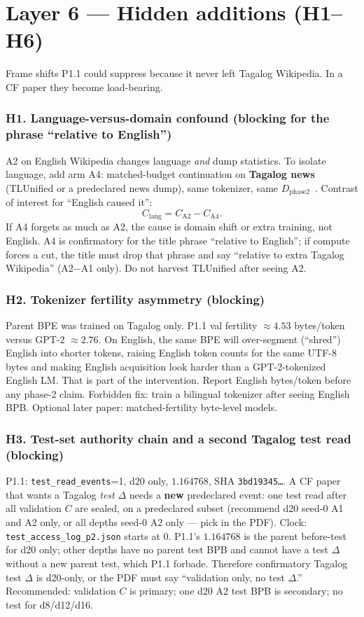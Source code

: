 \documentclass[11pt,a4paper]{article}
\begin{document}
\section{Layer 6 --- Hidden additions (H1--H6)}
\label{sec:L6}

Frame shifts P1.1 could suppress because it never left Tagalog Wikipedia. In a CF paper they become load-bearing.

\subsubsection*{H1. Language-versus-domain confound (blocking for the phrase ``relative to English'')}
A2 on English Wikipedia changes language \emph{and} dump statistics. To isolate language, add arm A4: matched-budget continuation on \textbf{Tagalog news} (TLUnified or a predeclared news dump), same tokenizer, same $D_{\mathrm{phase2}}$~\cite{cruz2022tlunified}. Contrast of interest for ``English caused it'':
\[
C_{\mathrm{lang}}=C_{\mathrm{A2}}-C_{\mathrm{A4}}.
\]
If A4 forgets as much as A2, the cause is domain shift or extra training, not English. A4 is confirmatory for the title phrase ``relative to English''; if compute forces a cut, the title must drop that phrase and say ``relative to extra Tagalog Wikipedia'' (A2$-$A1 only). Do not harvest TLUnified after seeing A2.

\subsubsection*{H2. Tokenizer fertility asymmetry (blocking)}
Parent BPE was trained on Tagalog only. P1.1 val fertility $\approx 4.53$ bytes/token versus GPT-2 $\approx 2.76$. On English, the same BPE will over-segment (``shred'') English into shorter tokens, raising English token counts for the same UTF-8 bytes and making English acquisition look harder than a GPT-2-tokenized English LM. That is part of the intervention. Report English bytes/token before any phase-2 claim. Forbidden fix: train a bilingual tokenizer after seeing English BPB. Optional later paper: matched-fertility byte-level models.

\subsubsection*{H3. Test-set authority chain and a second Tagalog test read (blocking)}
P1.1: \texttt{test\_read\_events}=1, d20 only, $1.164768$, SHA \texttt{3bd19345\ldots}. A CF paper that wants a Tagalog \emph{test} $\Delta$ needs a \textbf{new} predeclared event: one test read after all validation $C$ are sealed, on a predeclared subset (recommend d20 seed-0 A1 and A2 only, or all depths seed-0 A2 only --- pick in the PDF). Clock: \texttt{test\_access\_log\_p2.json} starts at 0. P1.1's $1.164768$ is the parent before-test for d20 only; other depths have no parent test BPB and cannot have a test $\Delta$ without a new parent test, which P1.1 forbade. Therefore confirmatory Tagalog test $\Delta$ is d20-only, or the PDF must say ``validation only, no test $\Delta$.'' Recommended: validation $C$ is primary; one d20 A2 test BPB is secondary; no test for d8/d12/d16.
\end{document}
